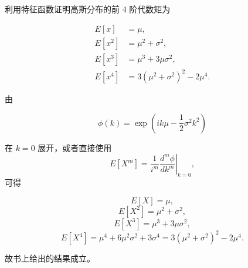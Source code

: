 \begin{question}
利用特征函数证明高斯分布的前 4 阶代数矩为

\[
\begin{split}
E[x]&=\mu,\\
E[x^2]&=\mu^2+\sigma^2,\\
E[x^3]&=\mu^3+3\mu\sigma^2,\\
E[x^4]&=3(\mu^2+\sigma^2)^2-2\mu^4.
\end{split}
\]
\begin{solution}
由

\[
\phi(k)=\exp\!\left(ik\mu-\frac12\sigma^2k^2\right)
\]

在 \(k=0\) 展开，或者直接使用 \[
E[X^m]=\left.\frac{1}{i^m}\frac{d^m\phi}{dk^m}\right|_{k=0},
\] 可得

\[
E[X]=\mu,
\] \[
E[X^2]=\mu^2+\sigma^2,
\] \[
E[X^3]=\mu^3+3\mu\sigma^2,
\] \[
E[X^4]=\mu^4+6\mu^2\sigma^2+3\sigma^4
=3(\mu^2+\sigma^2)^2-2\mu^4.
\]

故书上给出的结果成立。
\end{solution}
\end{question}



